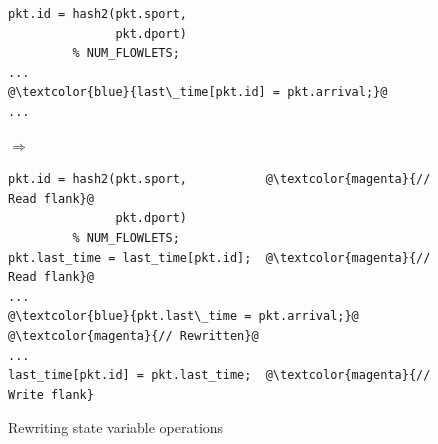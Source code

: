 \begin{figure}[!t]
  \begin{minipage}{0.43\textwidth}
  \begin{small}
  \begin{lstlisting}[style=customcscriptsize, numbers=none, frame=none]
pkt.id = hash2(pkt.sport,
               pkt.dport)
         % NUM_FLOWLETS;
...
@\textcolor{blue}{last\_time[pkt.id] = pkt.arrival;}@
...
  \end{lstlisting}
  \end{small}
  \end{minipage}
%  
  \hspace{-0.5in}
  $\Longrightarrow$ 
  \hspace{-0.2in}
%  
  \begin{minipage}{0.61\textwidth}
  \begin{small}
  \begin{lstlisting}[style=customcscriptsize, numbers=none, frame=none]
pkt.id = hash2(pkt.sport,           @\textcolor{magenta}{// Read flank}@
               pkt.dport)
         % NUM_FLOWLETS;
pkt.last_time = last_time[pkt.id];  @\textcolor{magenta}{// Read flank}@
...
@\textcolor{blue}{pkt.last\_time = pkt.arrival;}@       @\textcolor{magenta}{// Rewritten}@
...
last_time[pkt.id] = pkt.last_time;  @\textcolor{magenta}{// Write flank}
  \end{lstlisting}
  \end{small}
  \end{minipage}
  \caption{Rewriting state variable operations}
\label{fig:stateful_flanks}
\end{figure}

